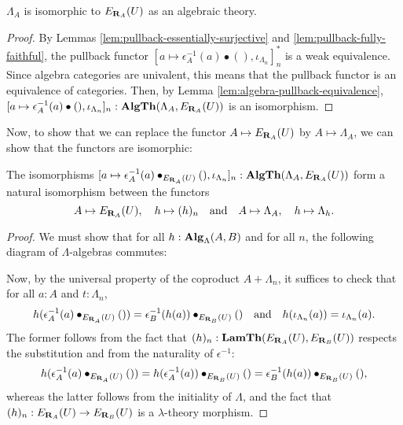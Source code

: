 \begin{lemma}
  $ \Lambda_A $ is isomorphic to $ E_{\mathbf{R}_A}(U) $ as an algebraic theory.
\end{lemma}
\begin{proof}
  By Lemmas \ref{lem:pullback-essentially-surjective} and  \ref{lem:pullback-fully-faithful}, the pullback functor $ [a \mapsto \epsilon_A^{-1}(a) \bullet (), \iota_{\Lambda_n}]_n^* $ is a weak equivalence. Since algebra categories are univalent, this means that the pullback functor is an equivalence of categories. Then, by Lemma \ref{lem:algebra-pullback-equivalence}, $ [a \mapsto \epsilon_A^{-1}(a) \bullet (), \iota_{\Lambda_n}]_n : \mathbf{AlgTh}(\Lambda_A, E_{\mathbf{R}_A}(U)) $ is an isomorphism.
\end{proof}

Now, to show that we can replace the functor $ A \mapsto E_{\mathbf{R}_A}(U) $ by $ A \mapsto \Lambda_A $, we can show that the functors are isomorphic:

\begin{lemma}
  The isomorphisms $ [a \mapsto \epsilon_A^{-1}(a) \bullet_{E_{\mathbf{R}_A}(U)} (), \iota_{\Lambda_n}]_n : \mathbf{AlgTh}(\Lambda_A, E_{\mathbf{R}_A}(U)) $ form a natural isomorphism between the functors
  \[ A \mapsto E_{\mathbf{R}_A}(U), \quad h \mapsto (h)_n \quad \text{and} \quad A \mapsto \Lambda_A, \quad h \mapsto \Lambda_h. \]
\end{lemma}
\begin{proof}
  We must show that for all $ h: \mathbf{Alg}_{\Lambda}(A, B) $ and for all $ n $, the following diagram of $ \Lambda $-algebras commutes:
  \begin{center}
  \end{center}
  Now, by the universal property of the coproduct $ A + \Lambda_n $, it suffices to check that for all $ a : A $ and $ t : \Lambda_n $,
  \[ h(\epsilon_A^{-1}(a) \bullet_{E_{\mathbf{R}_A}(U)} ()) = \epsilon_B^{-1}(h(a)) \bullet_{E_{\mathbf{R}_B}(U)} () \quad \text{and} \quad h(\iota_{\Lambda_n}(a)) = \iota_{\Lambda_n}(a). \]
  The former follows from the fact that $ (h)_n : \mathbf{LamTh}(E_{\mathbf{R}_A}(U), E_{\mathbf{R}_B}(U)) $ respects the substitution and from the naturality of $ \epsilon^{-1} $:
  \[ h(\epsilon_A^{-1}(a) \bullet_{E_{\mathbf{R}_A}(U)} ())
    = h(\epsilon_A^{-1}(a)) \bullet_{E_{\mathbf{R}_B}(U)} ()
    = \epsilon_B^{-1}(h(a)) \bullet_{E_{\mathbf{R}_B}(U)} (), \]
  whereas the latter follows from the initiality of $ \Lambda $, and the fact that $ (h)_n : E_{\mathbf{R}_A}(U) \to E_{\mathbf{R}_B}(U) $ is a $ \lambda $-theory morphism.
\end{proof}

